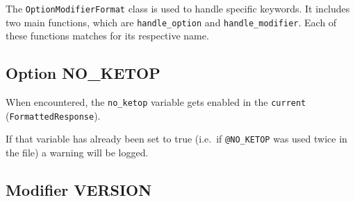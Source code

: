 
The \verb|OptionModifierFormat| class is used to handle specific keywords. It includes two main functions, which are \verb|handle_option| and \verb|handle_modifier|. Each of these functions matches for its respective name. 

\subsection{Option NO\_KETOP}

When encountered, the \verb|no_ketop| variable gets enabled in the \verb|current| \\(\verb|FormattedResponse|).

If that variable has already been set to true (i.e.\ if \verb|@NO_KETOP| was used twice in the file) a warning will be logged.

\subsection{Modifier VERSION}
